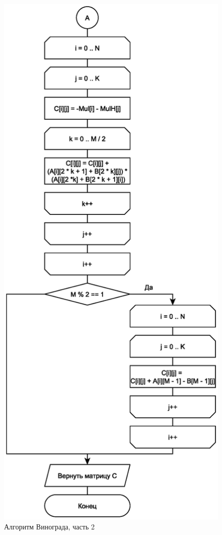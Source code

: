\begin{figure}[h]
	\centering
	\includegraphics[scale=0.7]{img/vinograd_2.eps}
	\caption{Алгоритм Винограда, часть 2}
	\label{fig:vin2}
\end{figure}

